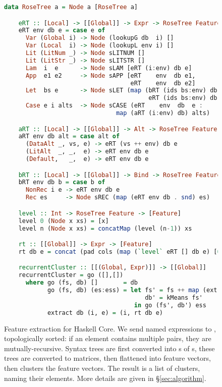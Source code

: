 \begin{figure}
  \begin{lstlisting}[language=Haskell, xleftmargin=.1\textwidth, xrightmargin=.1\textwidth]
    data RoseTree a = Node a [RoseTree a]

    eRT :: [Local] -> [[Global]] -> Expr -> RoseTree Feature
    eRT env db e = case e of
      Var (Global i) -> Node (lookupG db  i) []
      Var (Local  i) -> Node (lookupL env i) []
      Lit (LitNum _) -> Node sLITNUM []
      Lit (LitStr _) -> Node sLITSTR []
      Lam  i  e      -> Node sLAM [eRT (i:env) db e]
      App  e1 e2     -> Node sAPP [eRT    env  db e1,
                                   eRT    env  db e2]
      Let  bs e      -> Node sLET (map (bRT (ids bs:env) db) bs ++
                                        eRT (ids bs:env) db  e
      Case e i alts  -> Node sCASE (eRT    env  db  e :
                               map (aRT (i:env) db) alts)

    aRT :: [Local] -> [[Global]] -> Alt -> RoseTree Feature
    aRT env db alt = case alt of
      (DataAlt _, vs, e) -> eRT (vs ++ env) db e
      (LitAlt  _, _,  e) -> eRT env db e
      (Default,   _,  e) -> eRT env db e

    bRT :: [Local] -> [[Global]] -> Bind -> RoseTree Feature
    bRT env db b = case b of
      NonRec i e -> eRT env db e
      Rec es     -> Node sREC (map (eRT env db . snd) es)

    level :: Int -> RoseTree Feature -> [Feature]
    level 0 (Node x xs) = [x]
    level n (Node x xs) = concatMap (level (n-1)) xs

    rt :: [[Global]] -> Expr -> [Feature]
    rt db e = concat (pad cols (map (`level` eRT [] db e) [0..rows]))

    recurrentCluster :: [[(Global, Expr)]] -> [[Global]]
    recurrentCluster = go ([],[])
      where go (fs, db) []       = db
            go (fs, db) (es:ess) = let fs' = fs ++ map (extract db) es
                                       db' = kMeans fs'
                                    in go (fs', db') ess
            extract db (i, e) = (i, rt db e)
  \end{lstlisting}
  \caption{Feature extraction for Haskell Core. We send named expressions to , topologically sorted: if an element contains multiple  pairs, they are mutually-recursive. Syntax trees are first converted into s of s, these trees are converted to matrices, then flattened into feature vectors, then  clusters the feature vectors. The result is a list of clusters, naming their elements. More details are given in \S \ref{sec:algorithm}.}
  \label{fig:featureextractionalgorithm}
  \iffalse TODO: Split this up, get rid of float warning \fi
\end{figure}

